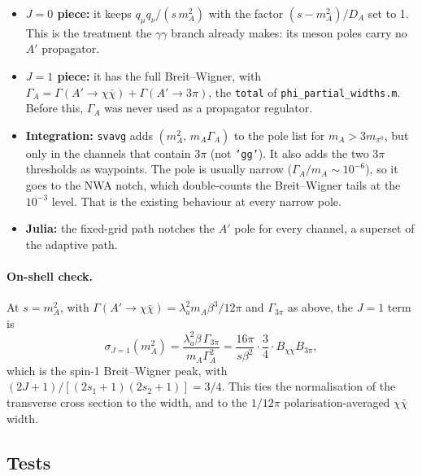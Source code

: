\documentclass{article}
\begin{document}
\begin{itemize}
\item \textbf{$J=0$ piece:} it keeps $q_\mu q_\nu/(s\,m_A^2)$ with the factor
  $(s-m_A^2)/D_A$ set to 1. This is the treatment the $\gamma\gamma$ branch already makes:
  its meson poles carry no $A'$ propagator.
\item \textbf{$J=1$ piece:} it has the full Breit--Wigner, with
  $\Gamma_A=\Gamma(A'\to\chi\bar\chi)+\Gamma(A'\to3\pi)$, the \texttt{total} of
  \texttt{phi\_partial\_widths.m}. Before this, $\Gamma_A$ was never used as a propagator
  regulator.
\item \textbf{Integration:} \texttt{svavg} adds $(m_A^2,\,m_A\Gamma_A)$ to the pole list for
  $m_A>3m_{\pi^0}$, but only in the channels that contain $3\pi$ (not \texttt{'gg'}). It also
  adds the two $3\pi$ thresholds as waypoints. The pole is usually narrow
  ($\Gamma_A/m_A\sim10^{-6}$), so it goes to the NWA notch, which double-counts the
  Breit--Wigner tails at the $10^{-3}$ level. That is the existing behaviour at every narrow pole.
\item \textbf{Julia:} the fixed-grid path notches the $A'$ pole for every channel, a superset of
  the adaptive path.
\end{itemize}

\paragraph{On-shell check.}
At $s=m_A^2$, with $\Gamma(A'\to\chi\bar\chi)=\lambda_a^2m_A\beta^3/12\pi$ and $\Gamma_{3\pi}$ as
above, the $J=1$ term is
\begin{equation}
  \sigma_{J=1}(m_A^2)=\frac{\lambda_a^2\beta\,\Gamma_{3\pi}}{m_A\Gamma_A^2}
  =\frac{16\pi}{s\beta^2}\cdot\frac{3}{4}\cdot B_{\chi\chi}B_{3\pi},
\end{equation}
which is the spin-1 Breit--Wigner peak, with $(2J+1)/[(2s_1+1)(2s_2+1)]=3/4$. This ties the
normalisation of the transverse cross section to the width, and to the $1/12\pi$
polarisation-averaged $\chi\bar\chi$ width.

\subsection{Tests}
\end{document}
